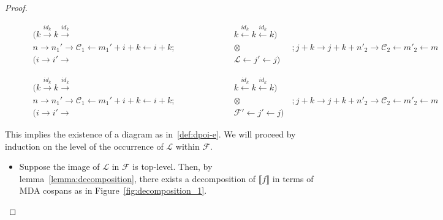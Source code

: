 \begin{proof}
\begin{figure*}
    \begin{subfigure}{\linewidth}
\begin{align*}
    (k \xrightarrow{id_{k}} k \xrightarrow{id_{k}} &k \xleftarrow{id_{k}} k \xleftarrow{id_{k}} k)\\
    n \xrightarrow{} n_{1}' \xrightarrow{} \mathcal{C}_{1} \xleftarrow{} m_{1}' + i + k \xleftarrow{} i + k; \qquad\qquad\qquad &\otimes \qquad\qquad\qquad ; j + k \xrightarrow{} j + k + n'_{2} \xrightarrow{} \mathcal{C}_{2} \xleftarrow{} m'_{2} \xleftarrow{} m\\
    (i \xrightarrow{} i' \xrightarrow{} &\mathcal{L} \xleftarrow{} j' \xleftarrow{} j)
\end{align*}
\subcaption{\;}
\end{subfigure}
\vspace{1ex}
\begin{subfigure}{\linewidth}
    \begin{align*}
        (k \xrightarrow{id_{k}} k \xrightarrow{id_{k}} &k \xleftarrow{id_{k}} k \xleftarrow{id_{k}} k)\\
        n \xrightarrow{} n_{1}' \xrightarrow{} \mathcal{C}_{1} \xleftarrow{} m_{1}' + i + k \xleftarrow{} i + k; \qquad\qquad\qquad &\otimes \qquad\qquad\qquad ; j + k \xrightarrow{} j + k + n'_{2} \xrightarrow{} \mathcal{C}_{2} \xleftarrow{} m'_{2} \xleftarrow{} m\\
        (i \xrightarrow{} i' \xrightarrow{} &\mathcal{F'} \xleftarrow{} j' \xleftarrow{} j)
    \end{align*}
\subcaption{\;}
\end{subfigure}
\caption{Decomposition}
\label{fig:decomposition_1}
\end{figure*}


This implies the existence of a diagram as in~\ref{def:dpoi-e}.
We will proceed by induction on the level of the occurrence of $\mathcal{L}$ within $\mathcal{F}$.
\begin{itemize}
	\item Suppose the image of $\mathcal{L}$ in $\mathcal{F}$ is top-level.
		  Then, by lemma~\ref{lemma:decomposition}, there exists a decomposition of $\llbracket f \rrbracket$ in terms of MDA cospans as in Figure~\ref{fig:decomposition_1}.


\end{itemize}
\end{proof}
